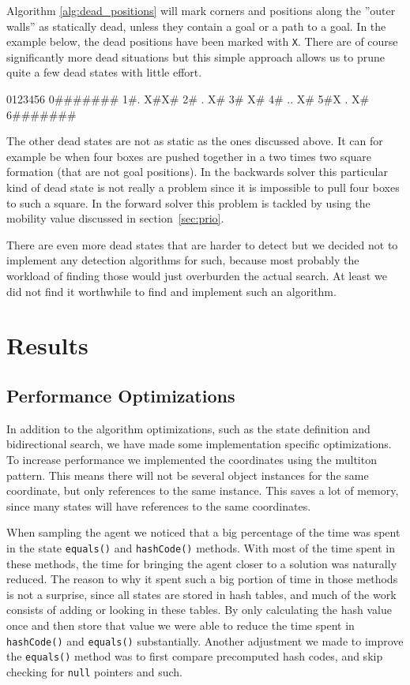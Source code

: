 \documentclass[a4paper,11pt]{article}
\begin{document}
Algorithm \ref{alg:dead_positions} will mark corners and positions along the
''outer walls'' as statically dead, unless they contain a goal or a path to a goal.
In the example below, the dead positions have been marked with \verb!X!.
There are of course significantly more dead situations but this simple approach 
allows us to prune quite a few dead states with little effort.

\begin{verbatimtab}
 0123456
0#######
1#. X#X#
2# .  X#
3#    X#
4# .. X#
5#X . X#
6#######

\end{verbatimtab}

The other dead states are not as static as the ones discussed above. 
It can for example be when four boxes are pushed together in a two times two square formation
(that are not goal positions).
In the backwards solver this particular kind of dead state is not really a problem since it is
impossible to pull four boxes to such a square.
In the forward solver this problem is tackled by using the mobility value discussed in section~\ref{sec:prio}.

There are even more dead states that are harder to detect but we decided not
to implement any detection algorithms for such, because most probably the
workload of finding those would just overburden the actual search.
At least we did not find it worthwhile to find and implement such an algorithm.

\section{Results}


\subsection{Performance Optimizations}
\label{sec:opt}
In addition to the algorithm optimizations, such as the state definition and bidirectional search,
we have made some implementation specific optimizations.
To increase performance we implemented
the coordinates using the multiton pattern.
This means there will not be several object instances for the same coordinate,
but only references to the same instance.
This saves a lot of memory, since many states will have references to the same coordinates.

When sampling the agent we noticed that a big percentage of the time was spent in the state \verb!equals()! and \verb!hashCode()! methods. 
With most of the time spent in these methods, the time for bringing the agent closer to a solution
was naturally reduced.
The reason to why it spent such a big portion of time in those methods is not a surprise,
since all states are stored in hash tables, and much of the work consists of
adding or looking in these tables.
By only calculating the hash value once and then store that value
we were able to reduce the time spent in \verb!hashCode()! and \verb!equals()! substantially.
Another adjustment we made to improve the \verb!equals()! method was to first compare precomputed hash codes,
and skip checking for \verb!null! pointers and such.
\end{document}
